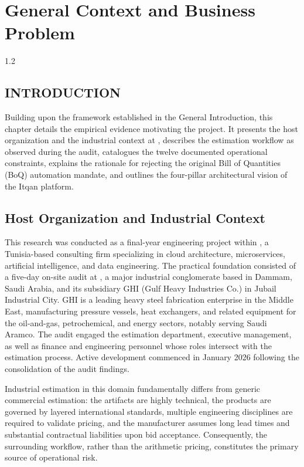 \chapter{General Context and Business Problem}\label{chap:context}
\begin{spacing}{1.2}
\minitoc
\thispagestyle{MyStyle}
\end{spacing}
\newpage

\section*{INTRODUCTION}
Building upon the framework established in the General Introduction, this chapter details the empirical evidence motivating the project. It presents the host organization and the industrial context at \clientCompany, describes the estimation workflow as observed during the audit, catalogues the twelve documented operational constraints, explains the rationale for rejecting the original Bill of Quantities (BoQ) automation mandate, and outlines the four-pillar architectural vision of the Itqan platform.

\section{Host Organization and Industrial Context}\label{sec:host_org}
This research was conducted as a final-year engineering project within \hostCompany, a Tunisia-based consulting firm specializing in cloud architecture, microservices, artificial intelligence, and data engineering. The practical foundation consisted of a five-day on-site audit at \clientCompany, a major industrial conglomerate based in Dammam, Saudi Arabia, and its subsidiary GHI (Gulf Heavy Industries Co.) in Jubail Industrial City. GHI is a leading heavy steel fabrication enterprise in the Middle East, manufacturing pressure vessels, heat exchangers, and related equipment for the oil-and-gas, petrochemical, and energy sectors, notably serving Saudi Aramco. The audit engaged the estimation department, executive management, as well as finance and engineering personnel whose roles intersect with the estimation process. Active development commenced in January 2026 following the consolidation of the audit findings.

Industrial estimation in this domain fundamentally differs from generic commercial estimation: the artifacts are highly technical, the products are governed by layered international standards, multiple engineering disciplines are required to validate pricing, and the manufacturer assumes long lead times and substantial contractual liabilities upon bid acceptance. Consequently, the surrounding workflow, rather than the arithmetic pricing, constitutes the primary source of operational risk.

